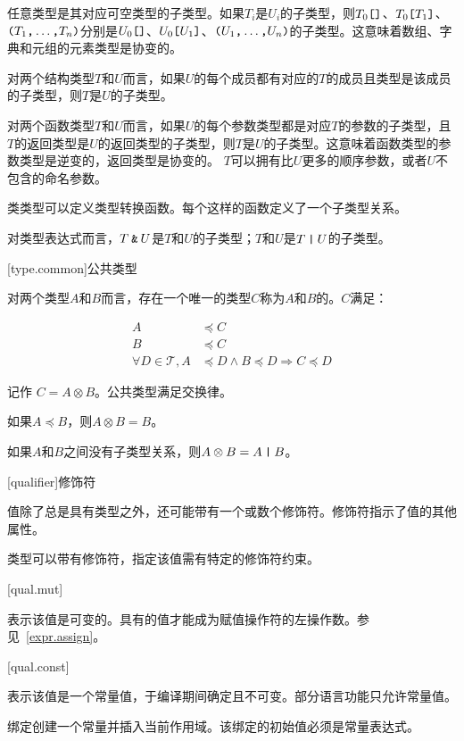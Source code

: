 \pnum
任意类型是其对应可空类型的子类型。如果$T_i$是$U_i$的子类型，则$T_0\texttt{[]}$、$T_0\texttt{[}T_1\texttt{]}$、$\texttt{(}T_1\texttt{,} \ldots\texttt{,} T_n\texttt{)}$分别是$U_0\texttt{[]}$、$U_0\texttt{[}U_1\texttt{]}$、$\texttt{(}U_1\texttt{,} \ldots\texttt{,} U_n\texttt{)}$的子类型。\enternote 这意味着数组、字典和元组的元素类型是协变的。 \exitnote

\pnum
对两个结构类型$T$和$U$而言，如果$U$的每个成员都有对应的$T$的成员且类型是该成员的子类型，则$T$是$U$的子类型。

\pnum
对两个函数类型$T$和$U$而言，如果$U$的每个参数类型都是对应$T$的参数的子类型，且$T$的返回类型是$U$的返回类型的子类型，则$T$是$U$的子类型。\enternote 这意味着函数类型的参数类型是逆变的，返回类型是协变的。 \exitnote $T$可以拥有比$U$更多的顺序参数，或者$U$不包含的命名参数。

\pnum
类类型可以定义类型转换函数。每个这样的函数定义了一个子类型关系。

\pnum
对类型表达式而言，$T\mathbin{\texttt{\&}}U$是$T$和$U$的子类型；$T$和$U$是$T\mathbin{\texttt{|}}U$的子类型。

[type.common]{公共类型}

\pnum
对两个类型$A$和$B$而言，存在一个唯一的类型$C$称为$A$和$B$的。$C$满足：

\begin{equation}
\begin{aligned}
    A &\preceq C \\
    B &\preceq C \\
    \forall D \in \mathcal{T}, A &\preceq D \land B \preceq D \Rightarrow C \preceq D
\end{aligned}
\end{equation}

记作 $C = A \otimes B$。公共类型满足交换律。

\pnum
如果$A \preceq B$，则$A \otimes B = B$。

\pnum
如果$A$和$B$之间没有子类型关系，则$A \otimes B = A \mathbin{\texttt{|}} B$。

[qualifier]{修饰符}

\pnum
值除了总是具有类型之外，还可能带有一个或数个修饰符。修饰符指示了值的其他属性。

\pnum
类型可以带有修饰符，指定该值需有特定的修饰符约束。

[qual.mut]{}

\pnum
{}表示该值是可变的。具有的值才能成为赋值操作符的左操作数。参见~\ref{expr.assign}。

[qual.const]{}

\pnum
{}表示该值是一个常量值，于编译期间确定且不可变。部分语言功能只允许常量值。

\pnum
{}绑定创建一个常量并插入当前作用域。该绑定的初始值必须是常量表达式。
